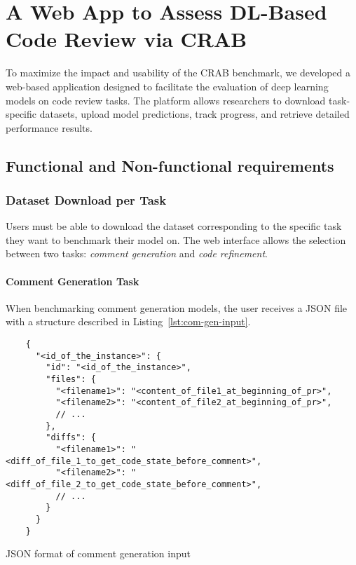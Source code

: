 \section{A Web App to Assess DL-Based Code Review via CRAB}
\label{sec:webapp}

To maximize the impact and usability of the CRAB benchmark, we developed a web-based application
designed to facilitate the evaluation of deep learning models on code review tasks. The platform
allows researchers to download task-specific datasets, upload model predictions, track progress, and
retrieve detailed performance results.

\subsection{Functional and Non-functional requirements}
\label{sec:req}

\subsubsection{Dataset Download per Task}

Users must be able to download the dataset corresponding to the specific task they want to benchmark
their model on. The web interface allows the selection between two tasks: \emph{comment generation}
and \emph{code refinement}.

\paragraph{Comment Generation Task}

When benchmarking comment generation models, the user receives a JSON file with a structure
described in Listing~\ref{lst:com-gen-input}.

\begin{listing}[!ht]
	\begin{verbatim}
    {
      "<id_of_the_instance>": {
        "id": "<id_of_the_instance>",
        "files": {
          "<filename1>": "<content_of_file1_at_beginning_of_pr>",
          "<filename2>": "<content_of_file2_at_beginning_of_pr>",
          // ...
        },
        "diffs": {
          "<filename1>": "<diff_of_file_1_to_get_code_state_before_comment>",
          "<filename2>": "<diff_of_file_2_to_get_code_state_before_comment>",
          // ...
        }
      }
    }
    \end{verbatim}
	\caption{JSON format of comment generation input}
	\label{lst:com-gen-input}
\end{listing}


